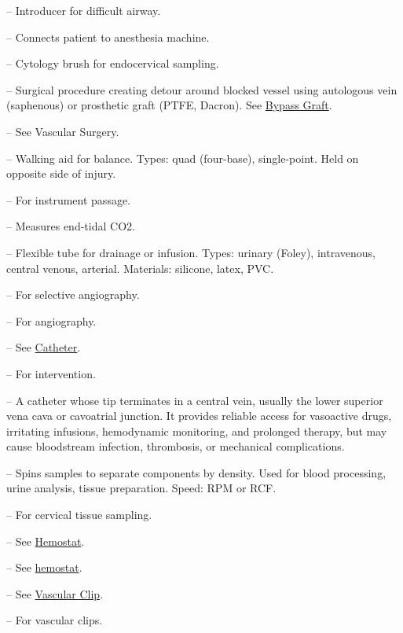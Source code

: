 -- Introducer for difficult airway.

-- Connects patient to anesthesia machine.

-- Cytology brush for endocervical sampling.

-- Surgical procedure creating detour around blocked vessel using autologous vein (saphenous) or prosthetic graft (PTFE, Dacron). See \hyperlink{Bypass Graft}{Bypass Graft}.

-- See Vascular Surgery.

-- Walking aid for balance. Types: quad (four-base), single-point. Held on opposite side of injury.

-- For instrument passage.

-- Measures end-tidal CO2.

-- Flexible tube for drainage or infusion. Types: urinary (Foley), intravenous, central venous, arterial. Materials: silicone, latex, PVC.

-- For selective angiography.

-- For angiography.

-- See \hyperlink{Catheter}{Catheter}.

-- For intervention.

-- A catheter whose tip terminates in a central vein, usually the lower superior vena cava or cavoatrial junction. It provides reliable access for vasoactive drugs, irritating infusions, hemodynamic monitoring, and prolonged therapy, but may cause bloodstream infection, thrombosis, or mechanical complications.

-- Spins samples to separate components by density. Used for blood processing, urine analysis, tissue preparation. Speed: RPM or RCF.

-- For cervical tissue sampling.

-- See \hyperlink{Hemostat}{Hemostat}.

-- See \hyperlink{Hemostat}{hemostat}.

-- See \hyperlink{Vascular Clip}{Vascular Clip}.

-- For vascular clips.

